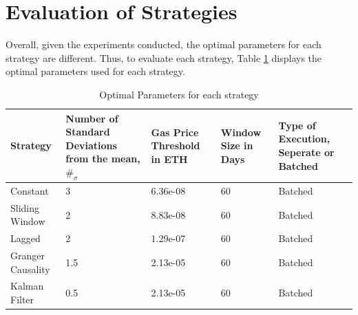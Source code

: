 \section{Evaluation of Strategies}
Overall, given the experiments conducted, the optimal parameters for each strategy are different. Thus, to evaluate each strategy, Table \ref{tab:OptimParams} displays the optimal parameters used for each strategy.

\begin{table}[H]
    \centering
    \begin{tabular}{|p{6em}|p{8em}|p{6em}|p{4em}|p{8em}|}
    \hline
        Strategy & Number of Standard Deviations from the mean, $\#_{\sigma}$ & Gas Price Threshold in ETH & Window Size in Days & Type of Execution, Seperate or Batched \\ \hline
        Constant & 3 & 6.36e-08 & 60 & Batched \\ \hline
        Sliding Window & 2 & 8.83e-08 & 60 & Batched \\ \hline
        Lagged & 2 & 1.29e-07 & 60 & Batched \\ \hline
        Granger Causality & 1.5 & 2.13e-05 & 60 & Batched \\ \hline
        Kalman Filter & 0.5 & 2.13e-05 & 60 & Batched \\ \hline
    \end{tabular}
    \caption{Optimal Parameters for each strategy \label{tab:OptimParams}}
\end{table}

